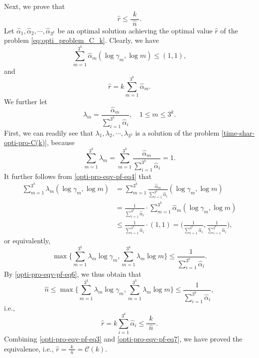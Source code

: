\documentclass[11pt,draftclsnofoot,onecolumn]{IEEEtran}
\begin{document}
\begin{journalonly}
{{Next, we prove that
\begin{equation}
\widehat{r}\leq \frac{k}{\,\,\widehat{n}\,\,}.
\end{equation}
Let  $\widehat{\alpha}_1,\widehat{\alpha}_2,\cdots,\widehat{\alpha}_{3^k}$ be an optimal solution achieving the optimal value $\widehat{r}$ of the problem \eqref{eq:opti_problem_C_k}.
Clearly, we have
\begin{equation}
\sum_{m=1}^{3^{k}}\widehat{\alpha}_{m}(\log\gamma_{m},\log m)\leq (1,1),\label{opti-pro-eqv-pf-eq4}
\end{equation}
and
\begin{equation}
\widehat{r}=k\sum_{m=1}^{3^{k}}\widehat{\alpha}_{m}.\label{opti-pro-eqv-pf-eq5}
\end{equation}
We further
let \begin{equation}
\lambda_{m}=\frac{\widehat{\alpha}_{m}}{\sum_{i=1}^{3^{k}}\widehat{\alpha}_{i}},\quad 1\leq m\leq 3^k.
\end{equation}
First, we can readily see that $\lambda_1,\lambda_2,\cdots,\lambda_{3^k}$
is a solution of the problem \eqref{time-shar-opti-pro-C(k)}, because
\begin{equation}
\sum_{m=1}^{3^k}\lambda_{m}=\sum_{m=1}^{3^k}\frac{\widehat{\alpha}_{m}}{\sum_{i=1}^{3^{k}}\widehat{\alpha}_{i}}=1.
\end{equation}
It further follows from \eqref{opti-pro-eqv-pf-eq4} that
\begin{align}
\sum_{m=1}^{3^{k}}\lambda_{m}(\log\gamma_{m},\log m)&=
\sum_{m=1}^{3^{k}}\frac{\widehat{\alpha}_{m}}{\sum_{i=1}^{3^{k}}\widehat{\alpha}_{i}}(\log\gamma_{m},\log m)\\&=
\frac{1}{\sum_{i=1}^{3^{k}}\widehat{\alpha}_{i}}\cdot\sum_{m=1}^{3^{k}}\widehat{\alpha}_{m}
(\log\gamma_{m},\log m)\nonumber\\
&\leq\frac{1}{\sum_{i=1}^{3^{k}}\widehat{\alpha}_{i}}\cdot (1,1)
= \Big(\frac{1}{\sum_{i=1}^{3^{k}}\widehat{\alpha}_{i}},\frac{1}{\sum_{i=1}^{3^{k}}\widehat{\alpha}_{i}}\Big),\label{opti-pro-eqv-pf-eq6}
\end{align}
or equivalently,
\begin{equation}
\max\Bigg\{\sum_{m=1}^{3^{k}}\lambda_{m}\log\gamma_{m},
\sum_{m=1}^{3^{k}}\lambda_{m}\log m\Bigg\}\leq \frac{1}{\sum_{i=1}^{3^{k}}\widehat{\alpha}_{i}}.\label{opti-pro-eqv-pf-eq6}
\end{equation}
By \eqref{opti-pro-eqv-pf-eq6}, we thus obtain that
\begin{equation}
\widehat{n}\leq\max\Bigg\{\sum_{m=1}^{3^{k}}\lambda_{m}\log\gamma_{m},
\sum_{m=1}^{3^{k}}\lambda_{m}\log m\Bigg\}\leq \frac{1}{\sum_{i=1}^{3^{k}}\widehat{\alpha}_{i}},
\end{equation}
i.e.,
\begin{equation}
\widehat{r}=k\sum_{i=1}^{3^{k}}\widehat{\alpha}_{i}\leq \frac{k}{\,\,\widehat{n}\,\,}.\label{opti-pro-eqv-pf-eq7}
\end{equation}
Combining \eqref{opti-pro-eqv-pf-eq3} and \eqref{opti-pro-eqv-pf-eq7}, we have proved the equivalence, i.e., $\widehat{r}=\frac{k}{\,\,\widehat{n}\,\,}=\mathcal{C}(k)$.
}

}
\end{journalonly}
\end{document}
